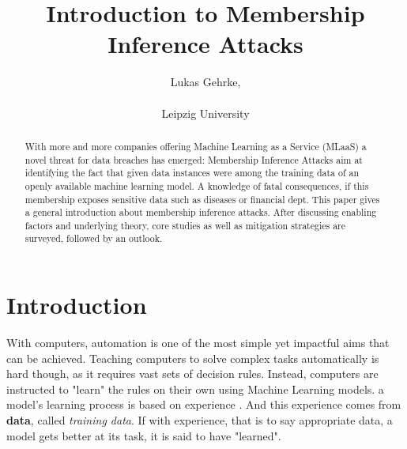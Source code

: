 \documentclass[runningheads]{llncs}
\begin{document}
%
\title{Introduction to Membership Inference Attacks}
%
%
\author{Lukas Gehrke, \\
 \\
Leipzig University \\
}
%
%
%

\maketitle
%

\tableofcontents
\newpage

\begin{abstract} 
    With more and more companies offering Machine Learning as a Service (MLaaS) a novel threat for data breaches has emerged: Membership Inference Attacks aim at identifying the fact that given data instances were among the training data of an openly available machine learning model. A knowledge of fatal consequences, if this membership exposes sensitive data such as diseases or financial dept. This paper gives a general introduction about membership inference attacks. After discussing enabling factors and underlying theory, core studies as well as mitigation strategies are surveyed, followed by an outlook.
    
\end{abstract}
%
%
%
\section{Introduction}

With computers, automation is one of the most simple yet impactful aims that can be achieved.
Teaching computers to solve complex tasks automatically is hard though, as it requires vast sets of decision rules. Instead, computers are instructed to "learn" the rules on their own using Machine Learning models. a model's learning process is based on experience \cite{mitchell1997machine}. And this experience comes from \textbf{data}, called \textit{training data}. If with experience, that is to say appropriate data, a model gets better at its task, it is said to have "learned".
\end{document}
